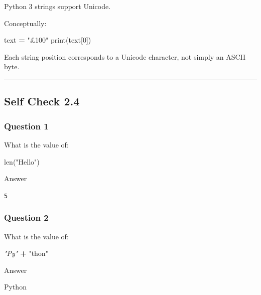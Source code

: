 \documentclass[
]{article}
\newenvironment{Shaded}{\begin{snugshade}}{\end{snugshade}}
\newcommand{\BuiltInTok}[1]{#1}
\newcommand{\CommentTok}[1]{\textcolor[rgb]{0.56,0.35,0.01}{\textit{#1}}}
\newcommand{\DecValTok}[1]{\textcolor[rgb]{0.00,0.00,0.81}{#1}}
\newcommand{\NormalTok}[1]{#1}
\newcommand{\OperatorTok}[1]{\textcolor[rgb]{0.81,0.36,0.00}{\textbf{#1}}}
\newcommand{\StringTok}[1]{\textcolor[rgb]{0.31,0.60,0.02}{#1}}
\begin{document}
Python 3 strings support Unicode.

Conceptually:

\begin{Shaded}
\begin{Highlighting}[]
\NormalTok{text }\OperatorTok{=} \StringTok{"£100"}
\BuiltInTok{print}\NormalTok{(text[}\DecValTok{0}\NormalTok{])}
\end{Highlighting}
\end{Shaded}

Each string position corresponds to a Unicode character, not simply an
ASCII byte.

\begin{center}\rule{0.5\linewidth}{0.5pt}\end{center}

\subsection{Self Check 2.4}\label{self-check-2.4}

\subsubsection{Question 1}\label{question-1-3}

What is the value of:

\begin{Shaded}
\begin{Highlighting}[]
\BuiltInTok{len}\NormalTok{(}\StringTok{"Hello"}\NormalTok{)}
\end{Highlighting}
\end{Shaded}

Answer

\texttt{5}

\subsubsection{Question 2}\label{question-2-3}

What is the value of:

\begin{Shaded}
\begin{Highlighting}[]
\CommentTok{"Py"} \OperatorTok{+} \StringTok{"thon"}
\end{Highlighting}
\end{Shaded}

Answer

\begin{Shaded}
\begin{Highlighting}[]
\NormalTok{Python}
\end{Highlighting}
\end{Shaded}
\end{document}
